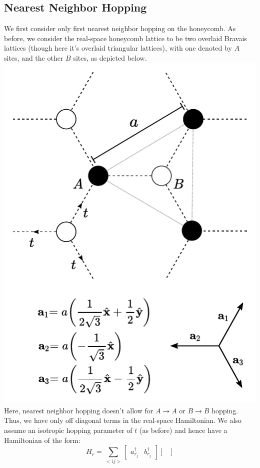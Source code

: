 \documentclass[10pt,a4paper]{article}\usepackage[]{graphicx}\usepackage[]{color}
\begin{document}
\begin{multicols}{2}
\subsection{Nearest Neighbor Hopping}
We first consider only first nearest neighbor hopping on the honeycomb.
As before, we consider the real-space honeycomb lattice to be two overlaid Bravais lattices (though here it's overlaid triangular lattices), with one denoted by $A$ sites, and the other $B$ sites, as depicted below.
\includegraphics[scale=0.85]{hc1nn.pdf}
Here, nearest neighbor hopping doesn't allow for $A\rightarrow A$ or $B\rightarrow B$ hopping. Thus, we have only off diagonal terms in the real-space Hamiltonian. We also assume an isotropic hopping parameter of $t$ (as before) and hence have a Hamiltonian of the form:
$$
H_r = 
\sum_{<ij>}
\begin{bmatrix}
a^{\dagger}_{r_j} & b^{\dagger}_{r_j}
\end{bmatrix}
\begin{bmatrix}

\end{bmatrix}$$
\end{multicols}
\end{document}
